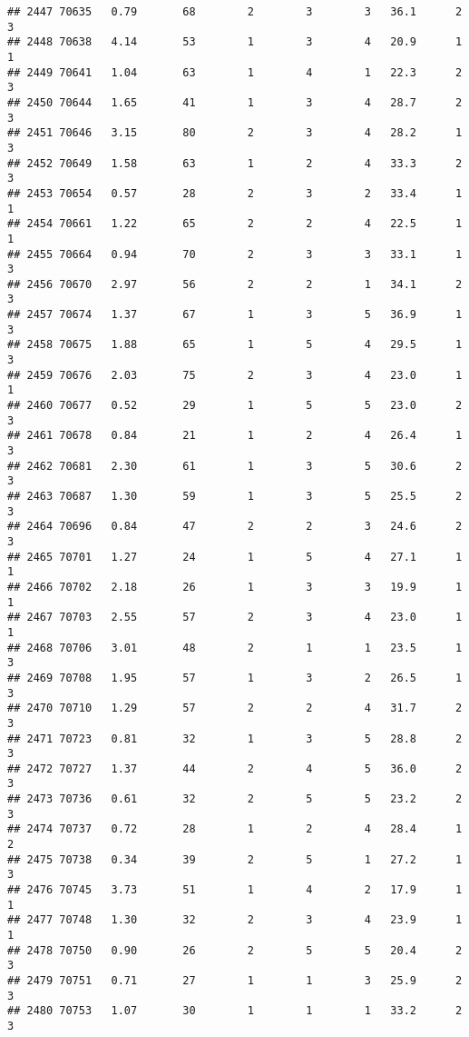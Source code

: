 \documentclass[
]{article}
\begin{document}
\begin{verbatim}
## 2447 70635   0.79       68        2        3        3   36.1      2      3
## 2448 70638   4.14       53        1        3        4   20.9      1      1
## 2449 70641   1.04       63        1        4        1   22.3      2      3
## 2450 70644   1.65       41        1        3        4   28.7      2      3
## 2451 70646   3.15       80        2        3        4   28.2      1      3
## 2452 70649   1.58       63        1        2        4   33.3      2      3
## 2453 70654   0.57       28        2        3        2   33.4      1      1
## 2454 70661   1.22       65        2        2        4   22.5      1      1
## 2455 70664   0.94       70        2        3        3   33.1      1      3
## 2456 70670   2.97       56        2        2        1   34.1      2      3
## 2457 70674   1.37       67        1        3        5   36.9      1      3
## 2458 70675   1.88       65        1        5        4   29.5      1      3
## 2459 70676   2.03       75        2        3        4   23.0      1      1
## 2460 70677   0.52       29        1        5        5   23.0      2      3
## 2461 70678   0.84       21        1        2        4   26.4      1      3
## 2462 70681   2.30       61        1        3        5   30.6      2      3
## 2463 70687   1.30       59        1        3        5   25.5      2      3
## 2464 70696   0.84       47        2        2        3   24.6      2      3
## 2465 70701   1.27       24        1        5        4   27.1      1      1
## 2466 70702   2.18       26        1        3        3   19.9      1      1
## 2467 70703   2.55       57        2        3        4   23.0      1      1
## 2468 70706   3.01       48        2        1        1   23.5      1      3
## 2469 70708   1.95       57        1        3        2   26.5      1      3
## 2470 70710   1.29       57        2        2        4   31.7      2      3
## 2471 70723   0.81       32        1        3        5   28.8      2      3
## 2472 70727   1.37       44        2        4        5   36.0      2      3
## 2473 70736   0.61       32        2        5        5   23.2      2      3
## 2474 70737   0.72       28        1        2        4   28.4      1      2
## 2475 70738   0.34       39        2        5        1   27.2      1      3
## 2476 70745   3.73       51        1        4        2   17.9      1      1
## 2477 70748   1.30       32        2        3        4   23.9      1      1
## 2478 70750   0.90       26        2        5        5   20.4      2      3
## 2479 70751   0.71       27        1        1        3   25.9      2      3
## 2480 70753   1.07       30        1        1        1   33.2      2      3

\end{verbatim}
\end{document}
